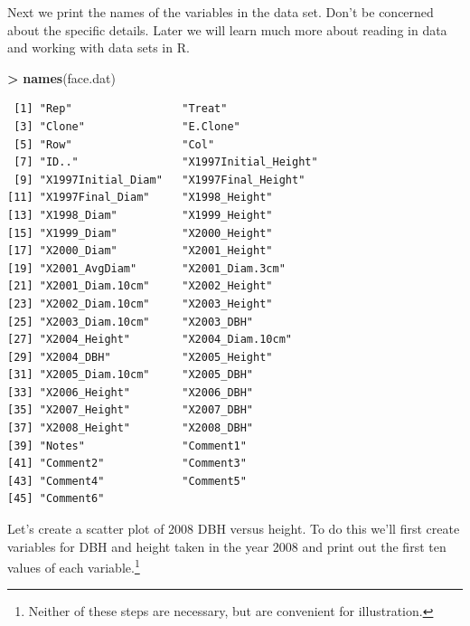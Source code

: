 \documentclass[]{krantz}
\makeatletter
\newenvironment{Shaded}{\begin{snugshade}}{\end{snugshade}}
\newcommand{\KeywordTok}[1]{\textcolor[rgb]{0.27,0.27,0.27}{\textbf{#1}}}
\newcommand{\DecValTok}[1]{\textcolor[rgb]{0.06,0.06,0.06}{#1}}
\newcommand{\StringTok}[1]{\textcolor[rgb]{0.5,0.5,0.5}{#1}}
\newcommand{\OperatorTok}[1]{\textcolor[rgb]{0.43,0.43,0.43}{\textbf{#1}}}
\newcommand{\NormalTok}[1]{#1}
\newenvironment{kframe}{%
\medskip{}
\setlength{\fboxsep}{.8em}
 \def\at@end@of@kframe{}%
 \ifinner\ifhmode%
  \def\at@end@of@kframe{\end{minipage}}%
  \begin{minipage}{\columnwidth}%
 \fi\fi%
 \def\FrameCommand##1{\hskip\@totalleftmargin \hskip-\fboxsep
 \colorbox{shadecolor}{##1}\hskip-\fboxsep
     \hskip-\linewidth \hskip-\@totalleftmargin \hskip\columnwidth}%
 \MakeFramed {\advance\hsize-\width
   \@totalleftmargin\z@ \linewidth\hsize
   \@setminipage}}%
 {\par\unskip\endMakeFramed%
 \at@end@of@kframe}
\renewenvironment{Shaded}{\begin{kframe}}{\end{kframe}}
\theoremstyle{definition}
\theoremstyle{definition}
\theoremstyle{definition}
\theoremstyle{remark}
\makeatother
\begin{document}
Next we print the names of the variables in the data set. Don't be
concerned about the specific details. Later we will learn much more
about reading in data and working with data sets in R.

\begin{Shaded}
\begin{Highlighting}[]
\OperatorTok{>}\StringTok{ }\KeywordTok{names}\NormalTok{(face.dat)}
\end{Highlighting}
\end{Shaded}

\begin{verbatim}
 [1] "Rep"                 "Treat"              
 [3] "Clone"               "E.Clone"            
 [5] "Row"                 "Col"                
 [7] "ID.."                "X1997Initial_Height"
 [9] "X1997Initial_Diam"   "X1997Final_Height"  
[11] "X1997Final_Diam"     "X1998_Height"       
[13] "X1998_Diam"          "X1999_Height"       
[15] "X1999_Diam"          "X2000_Height"       
[17] "X2000_Diam"          "X2001_Height"       
[19] "X2001_AvgDiam"       "X2001_Diam.3cm"     
[21] "X2001_Diam.10cm"     "X2002_Height"       
[23] "X2002_Diam.10cm"     "X2003_Height"       
[25] "X2003_Diam.10cm"     "X2003_DBH"          
[27] "X2004_Height"        "X2004_Diam.10cm"    
[29] "X2004_DBH"           "X2005_Height"       
[31] "X2005_Diam.10cm"     "X2005_DBH"          
[33] "X2006_Height"        "X2006_DBH"          
[35] "X2007_Height"        "X2007_DBH"          
[37] "X2008_Height"        "X2008_DBH"          
[39] "Notes"               "Comment1"           
[41] "Comment2"            "Comment3"           
[43] "Comment4"            "Comment5"           
[45] "Comment6"           
\end{verbatim}

Let's create a scatter plot of 2008 DBH versus height. To do this we'll
first create variables for DBH and height taken in the year 2008 and
print out the first ten values of each variable.\footnote{Neither of
  these steps are necessary, but are convenient for illustration.}

\begin{Shaded}
\end{Shaded}
\end{document}
